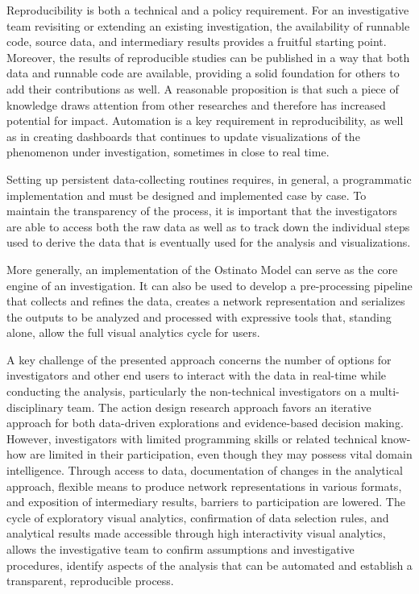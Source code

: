 Reproducibility is both a technical and a policy requirement. For an investigative team revisiting or extending an existing investigation, the availability of runnable code, source data, and intermediary results provides a fruitful starting point. Moreover, the results of reproducible studies can be published in a way that both data and runnable code are available, providing a solid foundation for others to add their contributions as well. A reasonable proposition is that such a piece of knowledge draws attention from other researches and therefore has increased potential for impact. Automation is a key requirement in reproducibility, as well as in creating dashboards that continues to update visualizations of the phenomenon under investigation, sometimes in close to real time.  

Setting up persistent data-collecting routines requires, in general, a programmatic implementation and must be designed and implemented case by case. To maintain the transparency of the process, it is important that the investigators are able to access both the raw data as well as to track down the individual steps used to derive the data that is eventually used for the analysis and visualizations.

More generally, an implementation of the Ostinato Model can serve as the core engine of an investigation. It can also be used to develop a pre-processing pipeline that collects and refines the data, creates a network representation and serializes the outputs to be analyzed and processed with expressive tools that, standing alone, allow the full visual analytics cycle for users. 

A key challenge of the presented approach concerns the number of options for investigators and other end users to interact with the data in real-time while conducting the analysis, particularly the non-technical investigators on a multi-disciplinary team. The action design research approach favors an iterative approach for both data-driven explorations and evidence-based decision making. However, investigators with limited programming skills or related technical know-how are limited in their participation, even though they may possess vital domain intelligence. Through access to data, documentation of changes in the analytical approach, flexible means to produce network representations in various formats, and exposition of intermediary results, barriers to participation are lowered. The cycle of exploratory visual analytics, confirmation of data selection rules, and analytical results made accessible through high interactivity visual analytics, allows the investigative team to confirm assumptions and investigative procedures, identify aspects of the analysis that can be automated and establish a transparent, reproducible process.